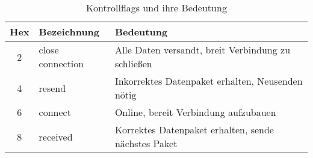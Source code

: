 \vspace{0.5cm}
\begin{table}[H]
    \center
    \def\arraystretch{1.3}
    \begin{tabular}{|c|l|l|}
        \rowcolor{gray!50}
        \hline
        \textbf{Hex} & \textbf{Bezeichnung} & \textbf{Bedeutung}                                  \\
        \hline
        2            & close connection     & Alle Daten versandt, breit Verbindung zu schließen  \\
        4            & resend               & Inkorrektes Datenpaket erhalten, Neusenden nötig    \\
        6            & connect              & Online, bereit Verbindung aufzubauen                \\
        8            & received             & Korrektes Datenpaket erhalten, sende nächstes Paket \\
        \hline
    \end{tabular}
    \caption{Kontrollflags und ihre Bedeutung}
    \label{tab:control_flags}
\end{table}